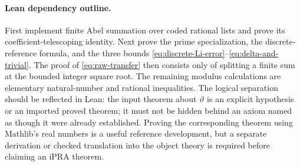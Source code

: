 \paragraph{Lean dependency outline.}
First implement finite Abel summation over coded rational lists and
prove its coefficient-telescoping identity.  Next prove the prime
specialization, the discrete-reference formula, and the three bounds
\eqref{eq:discrete-Li-error}--\eqref{eq:delta-and-trivial}.  The proof of
\eqref{eq:raw-transfer} then consists only of splitting a finite sum at
the bounded integer square root.  The remaining modulus calculations
are elementary natural-number and rational inequalities.  The logical
separation should be reflected in Lean: the input theorem about
$\vartheta$ is an explicit hypothesis or an imported proved theorem;
it must not be hidden behind an axiom named as though it were already
established.  Proving the corresponding theorem using Mathlib's real
numbers is a useful reference development, but a separate derivation
or checked translation into the object theory is required before
claiming an iPRA theorem.
